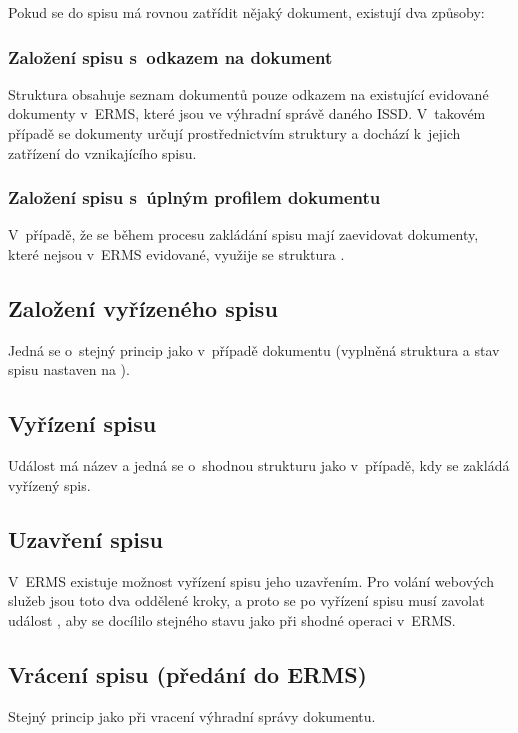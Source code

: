 \documentclass[
  master,
  field=ainfp,
  biblatex,
  language=czech,
  glossaries,
  theorems=false,
  index
]{kidiplom}
\begin{document}
Pokud se do spisu má rovnou zatřídit nějaký dokument, existují dva způsoby:

\subsubsection{Založení spisu s~odkazem na dokument}   
Struktura  obsahuje seznam dokumentů pouze odkazem na existující evidované dokumenty v~ERMS, které jsou ve výhradní správě daného ISSD. V~takovém případě se dokumenty určují prostřednictvím struktury  a dochází k~jejich zatřízení do vznikajícího spisu.

\subsubsection{Založení spisu s~úplným profilem dokumentu}
V~případě, že se během procesu zakládání spisu mají zaevidovat dokumenty, které nejsou v~ERMS evidované, využije se struktura .

\subsection{Založení vyřízeného spisu}
Jedná se o~stejný princip jako v~případě dokumentu (vyplněná struktura  a stav spisu nastaven na ).

\subsection{Vyřízení spisu}
Událost má název  a jedná se o~shodnou strukturu jako v~případě, kdy se zakládá vyřízený spis.

\subsection{Uzavření spisu}  
V~ERMS existuje možnost vyřízení spisu jeho uzavřením. Pro volání webových služeb jsou toto dva oddělené kroky, a proto se po vyřízení spisu musí zavolat událost , aby se docílilo stejného stavu jako při shodné operaci v~ERMS.

\subsection{Vrácení spisu (předání do ERMS)}         
Stejný princip jako při vracení výhradní správy dokumentu.
\end{document}
